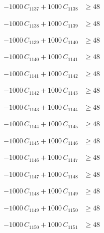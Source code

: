 \documentclass[a4paper,11pt]{article}
\begin{document}
\begin{align}
-1000\,C_{1137} + 1000\,C_{1138} &\geq 48 \nonumber
\end{align}

\begin{align}
-1000\,C_{1138} + 1000\,C_{1139} &\geq 48 \nonumber
\end{align}

\begin{align}
-1000\,C_{1139} + 1000\,C_{1140} &\geq 48 \nonumber
\end{align}

\begin{align}
-1000\,C_{1140} + 1000\,C_{1141} &\geq 48 \nonumber
\end{align}

\begin{align}
-1000\,C_{1141} + 1000\,C_{1142} &\geq 48 \nonumber
\end{align}

\begin{align}
-1000\,C_{1142} + 1000\,C_{1143} &\geq 48 \nonumber
\end{align}

\begin{align}
-1000\,C_{1143} + 1000\,C_{1144} &\geq 48 \nonumber
\end{align}

\begin{align}
-1000\,C_{1144} + 1000\,C_{1145} &\geq 48 \nonumber
\end{align}

\begin{align}
-1000\,C_{1145} + 1000\,C_{1146} &\geq 48 \nonumber
\end{align}

\begin{align}
-1000\,C_{1146} + 1000\,C_{1147} &\geq 48 \nonumber
\end{align}

\begin{align}
-1000\,C_{1147} + 1000\,C_{1148} &\geq 48 \nonumber
\end{align}

\begin{align}
-1000\,C_{1148} + 1000\,C_{1149} &\geq 48 \nonumber
\end{align}

\begin{align}
-1000\,C_{1149} + 1000\,C_{1150} &\geq 48 \nonumber
\end{align}

\begin{align}
-1000\,C_{1150} + 1000\,C_{1151} &\geq 48 \nonumber
\end{align}
\end{document}
